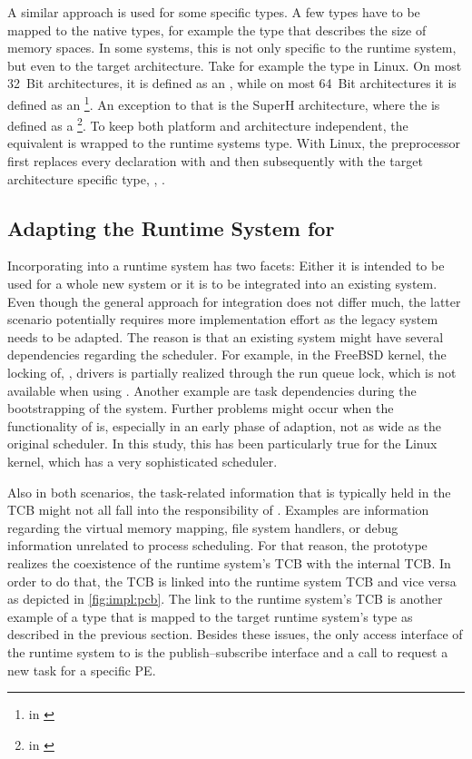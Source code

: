 A similar approach is used for some specific types. A few types have to be mapped to the native types, for example the type that describes the size of memory spaces. In some systems, this is not only specific to the runtime system, but even to the target architecture. Take for example the  type in Linux. On most 32~Bit architectures, it is defined as an , while on most 64~Bit architectures it is defined as an \footnote{\cf{}  in \cite{Linux44}}. An exception to that is the SuperH architecture, where the  is defined as a \footnote{\cf{}  in \cite{Linux44}}. To keep \cobas{} both platform and architecture independent, the \cobas{}  equivalent  is wrapped to the runtime systems type. With Linux, the preprocessor first replaces every  declaration with  and then subsequently with the target architecture specific type, \eg{}, .

\subsection{Adapting the Runtime System for \cobas{}}

Incorporating \cobas{} into a runtime system has two facets: Either it is intended to be used for a whole new system or it is to be integrated into an existing system. Even though the general approach for integration does not differ much, the latter scenario potentially requires more implementation effort as the legacy system needs to be adapted. The reason is that an existing system might have several dependencies regarding the scheduler. For example, in the FreeBSD kernel, the locking of, \eg{}, drivers is partially realized through the run queue lock, which is not available when using \cobas{}. Another example are task dependencies during the bootstrapping of the system. Further problems might occur when the functionality of \cobas{} is, especially in an early phase of adaption, not as wide as the original scheduler. In this study, this has been particularly true for the Linux kernel, which has a very sophisticated scheduler.

Also in both scenarios, the task-related information that is typically held in the \ac{TCB} might not all fall into the responsibility of \cobas{}. Examples are information regarding the virtual memory mapping, file system handlers, or debug information unrelated to process scheduling. For that reason, the \cobas{} prototype realizes the coexistence of the runtime system's \ac{TCB} with the \cobas{} internal \ac{TCB}. In order to do that, the \cobas{} \ac{TCB} is linked into the runtime system \ac{TCB} and vice versa as depicted in \cref{fig:impl:pcb}. The link to the runtime system's \ac{TCB} is another example of a type that is mapped to the target runtime system's type as described in the previous section. Besides these issues, the only access interface of the runtime system to \cobas{} is the publish–subscribe interface and a call to request a new task for a specific \ac{PE}.


